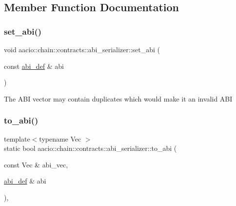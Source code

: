 \subsection{Member Function Documentation}
\mbox{\label{structaacio_1_1chain_1_1contracts_1_1abi__serializer_a3e71b20253e6ac8f1c1eebb5584d99ed}} 
\subsubsection{\texorpdfstring{set\+\_\+abi()}{set\_abi()}}
{\footnotesize\ttfamily void aacio\+::chain\+::contracts\+::abi\+\_\+serializer\+::set\+\_\+abi (\begin{DoxyParamCaption}\item[{const \mbox{\hyperlink{structaacio_1_1chain_1_1contracts_1_1abi__def}{abi\+\_\+def}} \&}]{abi }\end{DoxyParamCaption})}

The A\+BI vector may contain duplicates which would make it an invalid A\+BI\mbox{\label{structaacio_1_1chain_1_1contracts_1_1abi__serializer_aaf369a687091d721f89734874053838c}} 
\subsubsection{\texorpdfstring{to\+\_\+abi()}{to\_abi()}}
{\footnotesize\ttfamily template$<$typename Vec $>$ \\
static bool aacio\+::chain\+::contracts\+::abi\+\_\+serializer\+::to\+\_\+abi (\begin{DoxyParamCaption}\item[{const Vec \&}]{abi\+\_\+vec,  }\item[{\mbox{\hyperlink{structaacio_1_1chain_1_1contracts_1_1abi__def}{abi\+\_\+def}} \&}]{abi }\end{DoxyParamCaption})\hspace{0.3cm}{\ttfamily [inline]}, {\ttfamily [static]}}

